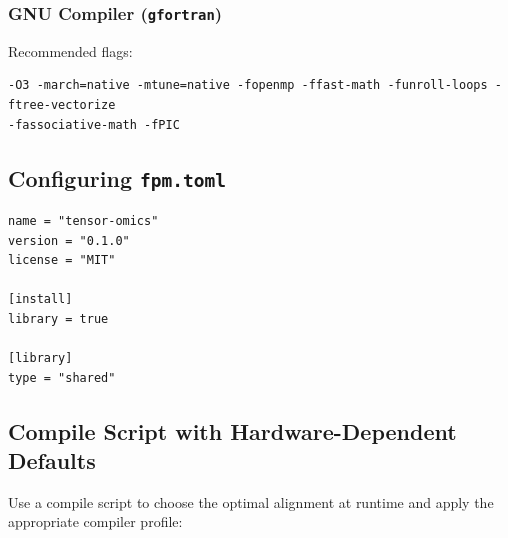 \documentclass{article}
\begin{document}
\subsubsection{GNU Compiler (\texttt{gfortran})}
\label{gfortran_flags}
Recommended flags:
\begin{verbatim}
-O3 -march=native -mtune=native -fopenmp -ffast-math -funroll-loops -ftree-vectorize 
-fassociative-math -fPIC
\end{verbatim}

\subsection{Configuring \texttt{fpm.toml}}

\begin{verbatim}
name = "tensor-omics"
version = "0.1.0"
license = "MIT"

[install]
library = true

[library]
type = "shared" 
\end{verbatim}

\subsection{Compile Script with Hardware-Dependent Defaults}
Use a compile script to choose the optimal alignment at runtime and apply the appropriate compiler profile:
\end{document}
